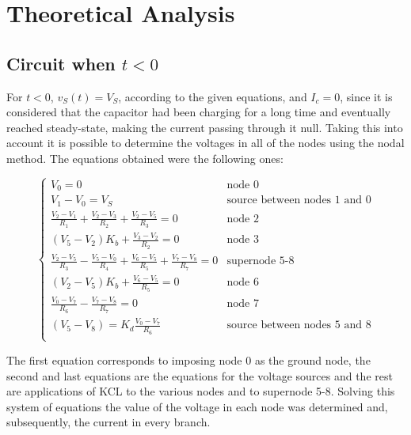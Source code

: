 \section{Theoretical Analysis}
\label{sec:analysis}



\subsection{Circuit when $t<0$} %
For $t<0$, $v_S(t) = V_S$, according to the given equations, and $I_c=0$, since it is considered that the capacitor had been charging for a long time and eventually reached steady-state, making the current passing through it null. Taking this into account it is possible to determine the voltages in all of the nodes using the nodal method. The equations obtained were the following ones:


\begin{equation}
  \begin{cases}
  V_0 = 0 & \mbox{node 0}\\
  V_1-V_0 = V_S & \mbox{source between nodes 1 and 0} \\
  \frac{V_2-V_1}{R_1}+\frac{V_2-V_3}{R_2}+\frac{V_2-V_5}{R_3} = 0 & \mbox{node 2} \\
  (V_5-V_2)K_b + \frac{V_3-V_2}{R_2} = 0 & \mbox{node 3} \\
  \frac{V_2-V_5}{R_3} - \frac{V_5-V_0}{R_4} + \frac{V_6-V_5}{R_5} + \frac{V_7-V_8}{R_7}  = 0 & \mbox{supernode 5-8} \\ 
  (V_2-V_5)K_b + \frac{V_6-V_5}{R_5} = 0 & \mbox{node 6} \\
  \frac{V_0-V_7}{R_6} - \frac{V_7-V_8}{R_7} = 0 & \mbox{node 7} \\
  (V_5-V_8) = K_d \frac{V_0-V_7}{R_6} & \mbox{source between nodes 5 and 8} \\
  \end{cases}
\end{equation}

The first equation corresponds to imposing node 0 as the ground node, the second and last equations are the equations for the voltage sources and the rest are applications of KCL to the various nodes and to supernode 5-8. %
Solving this system of equations the value of the voltage in each node was determined and, subsequently, the current in every branch.

